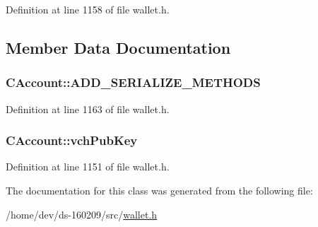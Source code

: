 Definition at line 1158 of file wallet.\+h.



\subsection{Member Data Documentation}
\hypertarget{class_c_account_ad1054a718063912b1c5e1103eaa005cc}{}
\subsubsection[{A\+D\+D\+\_\+\+S\+E\+R\+I\+A\+L\+I\+Z\+E\+\_\+\+M\+E\+T\+H\+O\+D\+S}]{\setlength{\rightskip}{0pt plus 5cm}C\+Account\+::\+A\+D\+D\+\_\+\+S\+E\+R\+I\+A\+L\+I\+Z\+E\+\_\+\+M\+E\+T\+H\+O\+D\+S}\label{class_c_account_ad1054a718063912b1c5e1103eaa005cc}


Definition at line 1163 of file wallet.\+h.

\hypertarget{class_c_account_a8bc9b476371009c12a6c25d4c7264de5}{}
\subsubsection[{vch\+Pub\+Key}]{ C\+Account\+::vch\+Pub\+Key}\label{class_c_account_a8bc9b476371009c12a6c25d4c7264de5}


Definition at line 1151 of file wallet.\+h.



The documentation for this class was generated from the following file\+:\begin{DoxyCompactItemize}
\item 
/home/dev/ds-\/160209/src/\hyperlink{wallet_8h}{wallet.\+h}\end{DoxyCompactItemize}
